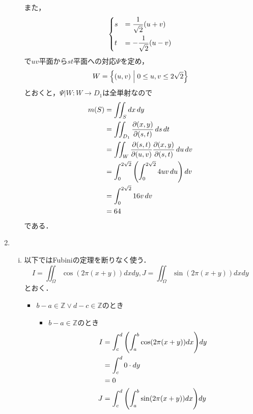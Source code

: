 \begin{enumerate}[(1)]
\begin{enumerate}[(i)]
        また，
        \begin{equation}
            \begin{dcases}
                s&=\frac{1}{\sqrt{2}}(u+v)\\
                t&=-\frac{1}{\sqrt{2}}(u-v)
            \end{dcases}
        \end{equation}
        で$uv$平面から$st$平面への対応$\Psi$を定め，
        \begin{equation}
            W=\qty{(u,v)\mathrel{}\middle|\mathrel{}0\le u, v \le 2\sqrt{2}}
        \end{equation}
        とおくと，$\Psi|W:W\to D_1$は全単射なので
        \begin{align}
            m(S)
            &=\iint_S \dd{x}\dd{y}\\
            &=\iint_{D_1} \frac{\partial ({x,y})}{\partial ({s,t})} \dd{s}\dd{t}\\
            &=\iint_W \frac{\partial ({s,t})}{\partial ({u,v})} \frac{\partial ({x,y})}{\partial ({s,t})} \dd{u}\dd{v}\\
            &=\int^{2\sqrt{2}}_0 \qty(\int^{2\sqrt{2}}_0 4uv \dd{u})\dd{v}\\
            &=\int^{2\sqrt{2}}_0 16v\dd{v}\\
            &=64
        \end{align}
        である．
    \end{enumerate}
    \item 
    \begin{enumerate}[(i)]
        \item 以下ではFubiniの定理を断りなく使う．
        \begin{equation}
            I=\iint_\Omega\cos(2\pi(x+y))dxdy,
            J=\iint_\Omega\sin(2\pi(x+y))dxdy
        \end{equation}
        とおく．
        \begin{itemize}
            \item $b - a \in \mathbb{Z} \lor d - c \in \mathbb{Z}$のとき
            \begin{itemize}
                \item $b - a \in \mathbb{Z}$のとき
                \begin{align}
                    I
                    &=\int^d_c \qty(\int^b_a \cos(2\pi(x+y))dx) dy\\
                    &=\int^d_c 0\cdot dy\\
                    &=0\\
                    J
                    &=\int^d_c \qty(\int^b_a \sin(2\pi(x+y))dx) dy\\

\end{align}
\end{itemize}
\end{itemize}
\end{enumerate}
\end{enumerate}
